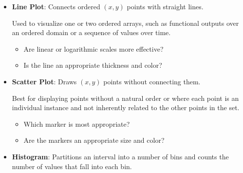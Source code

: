 \small{ %
\begin{itemize}
\item \textbf{Line Plot}: Connects ordered $(x,y)$ points with straight lines.

Used to visualize one or two ordered arrays, such as functional outputs over an ordered domain or a sequence of values over time.
%
\begin{itemize}
    \item Are linear or logarithmic scales more effective?
    \item Is the line an appropriate thickness and color?
\end{itemize}


\item \textbf{Scatter Plot}: Draws $(x,y)$ points without connecting them.

Best for displaying points without a natural order or where each point is an individual instance and not inherently related to the other points in the set.
%
\begin{itemize}
    \item Which marker is most appropriate?
    \item Are the markers an appropriate size and color?
\end{itemize}

\item \textbf{Histogram}: Partitions an interval into a number of bins and counts the number of values that fall into each bin.


\end{itemize}}
